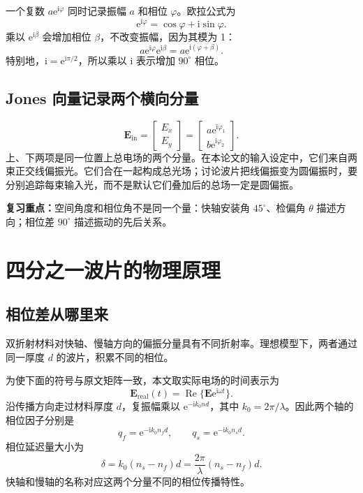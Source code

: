 \documentclass[UTF8,fontset=fandol,11pt,a4paper]{ctexart}
\newcommand{\ii}{\mathrm i}
\newcommand{\ee}{\mathrm e}
\newcommand{\note}[1]{\par\noindent\colorbox{pale}{\parbox{\dimexpr\linewidth-2\fboxsep\relax}{\textbf{复习重点：}#1}}\par}
\newcommand{\colvec}[2]{\begin{bmatrix}#1\\#2\end{bmatrix}}
\begin{document}
一个复数 $a\ee^{\ii\varphi}$ 同时记录振幅 $a$ 和相位 $\varphi$。欧拉公式为
\begin{equation}
\ee^{\ii\varphi}=\cos\varphi+\ii\sin\varphi.
\end{equation}
乘以 $\ee^{\ii\beta}$ 会增加相位 $\beta$，不改变振幅，因为其模为 1：
\begin{equation}
a\ee^{\ii\varphi}\ee^{\ii\beta}=a\ee^{\ii(\varphi+\beta)}.
\end{equation}
特别地，$\ii=\ee^{\ii\pi/2}$，所以乘以 $\ii$ 表示增加 $90^\circ$ 相位。

\subsection{Jones 向量记录两个横向分量}
\begin{equation}
\mathbf E_{\mathrm{in}}=
\colvec{E_x}{E_y}=
\colvec{a\ee^{\ii\varphi_1}}{b\ee^{\ii\varphi_2}}.
\end{equation}
上、下两项是同一位置上总电场的两个分量。在本论文的输入设定中，它们来自两束正交线偏振光。它们合在一起构成总光场；讨论波片把线偏振变为圆偏振时，要分别追踪每束输入光，而不是默认它们叠加后的总场一定是圆偏振。

\note{空间角度和相位角不是同一个量：快轴安装角 $45^\circ$、检偏角 $\theta$ 描述方向；相位差 $90^\circ$ 描述振动的先后关系。}

\clearpage
\section{四分之一波片的物理原理}
\subsection{相位差从哪里来}
双折射材料对快轴、慢轴方向的偏振分量具有不同折射率。理想模型下，两者通过同一厚度 $d$ 的波片，积累不同的相位。

为使下面的符号与原文矩阵一致，本文取实际电场的时间表示为
\begin{equation}
\mathbf E_{\mathrm{real}}(t)=\operatorname{Re}\{\mathbf E\ee^{\ii\omega t}\}.
\end{equation}
沿传播方向走过材料厚度 $d$，复振幅乘以 $\ee^{-\ii k_0nd}$，其中 $k_0=2\pi/\lambda$。因此两个轴的相位因子分别是
\begin{equation}
q_f=\ee^{-\ii k_0n_fd},\qquad q_s=\ee^{-\ii k_0n_sd}.
\end{equation}
相位延迟量大小为
\begin{equation}
\boxed{\delta=k_0(n_s-n_f)d=\frac{2\pi}{\lambda}(n_s-n_f)d.}
\end{equation}
快轴和慢轴的名称对应这两个分量不同的相位传播特性。
\end{document}
